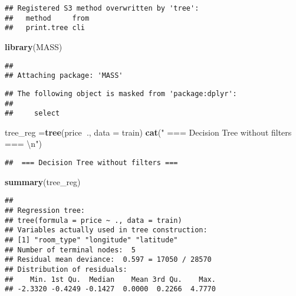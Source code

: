 \documentclass[
]{article}
\newenvironment{Shaded}{\begin{snugshade}}{\end{snugshade}}
\newcommand{\CharTok}[1]{\textcolor[rgb]{0.31,0.60,0.02}{#1}}
\newcommand{\DataTypeTok}[1]{\textcolor[rgb]{0.13,0.29,0.53}{#1}}
\newcommand{\DecValTok}[1]{\textcolor[rgb]{0.00,0.00,0.81}{#1}}
\newcommand{\KeywordTok}[1]{\textcolor[rgb]{0.13,0.29,0.53}{\textbf{#1}}}
\newcommand{\NormalTok}[1]{#1}
\newcommand{\OperatorTok}[1]{\textcolor[rgb]{0.81,0.36,0.00}{\textbf{#1}}}
\newcommand{\StringTok}[1]{\textcolor[rgb]{0.31,0.60,0.02}{#1}}
\begin{document}
\begin{verbatim}
## Registered S3 method overwritten by 'tree':
##   method     from
##   print.tree cli
\end{verbatim}

\begin{Shaded}
\begin{Highlighting}[]
\KeywordTok{library}\NormalTok{(MASS)}
\end{Highlighting}
\end{Shaded}

\begin{verbatim}
## 
## Attaching package: 'MASS'
\end{verbatim}

\begin{verbatim}
## The following object is masked from 'package:dplyr':
## 
##     select
\end{verbatim}

\begin{Shaded}
\begin{Highlighting}[]
\NormalTok{tree_reg =}\KeywordTok{tree}\NormalTok{(price}\OperatorTok{~}\NormalTok{., }\DataTypeTok{data =}\NormalTok{ train)}
\KeywordTok{cat}\NormalTok{(}\StringTok{" === Decision Tree without filters === }\CharTok{\textbackslash{}n}\StringTok{"}\NormalTok{)}
\end{Highlighting}
\end{Shaded}

\begin{verbatim}
##  === Decision Tree without filters ===
\end{verbatim}

\begin{Shaded}
\begin{Highlighting}[]
\KeywordTok{summary}\NormalTok{(tree_reg)}
\end{Highlighting}
\end{Shaded}

\begin{verbatim}
## 
## Regression tree:
## tree(formula = price ~ ., data = train)
## Variables actually used in tree construction:
## [1] "room_type" "longitude" "latitude" 
## Number of terminal nodes:  5 
## Residual mean deviance:  0.597 = 17050 / 28570 
## Distribution of residuals:
##    Min. 1st Qu.  Median    Mean 3rd Qu.    Max. 
## -2.3320 -0.4249 -0.1427  0.0000  0.2266  4.7770
\end{verbatim}

\begin{Shaded}
\end{Shaded}
\end{document}

